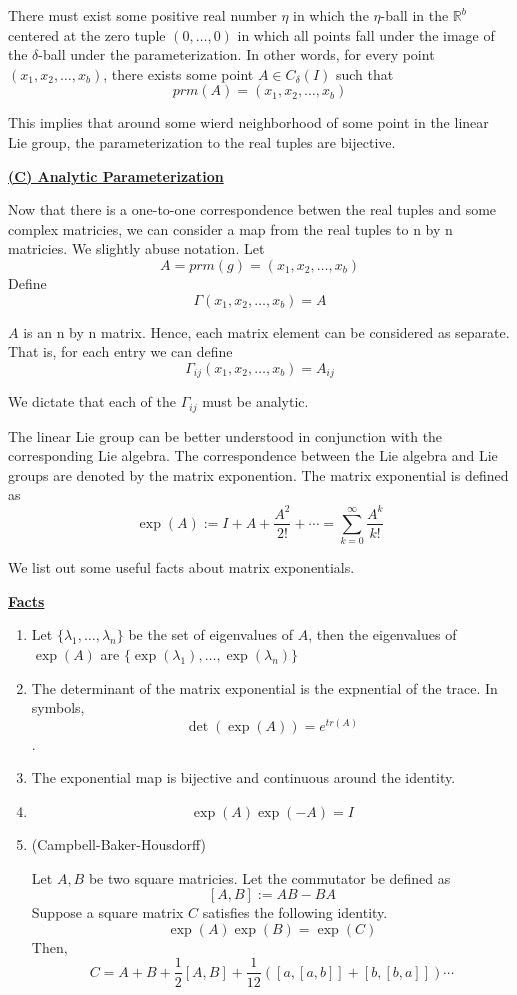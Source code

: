 \documentclass{article}
\newcommand{\new}[1]{
    \vspace{2mm}
    \noindent
    \textbf{
    \underline{#1}}
}
\begin{document}
There must exist some positive real number $\eta$ in which 
the $\eta$-ball in the $\mathbb{R}^b$ centered at the zero tuple 
$(0, \dots, 0)$ in which all points fall under the image of the 
$\delta$-ball under the parameterization. In other words, for every point 
$(x_1, x_2, \dots, x_b)$, there exists some point $A \in C_\delta(I)$ such that 
\[
    prm(A) = (x_1, x_2, \dots, x_b)
\]

This implies that around some wierd neighborhood of some point in the 
linear Lie group, the parameterization to the real tuples are bijective. 

\new{
(C) Analytic Parameterization
}

Now that there is a one-to-one correspondence betwen 
the real tuples and some complex matricies, we can consider 
a map from the real tuples to n by n matricies. 
We slightly abuse notation. Let 
\[
    A = prm(g) = (x_1, x_2, \dots, x_b)
    \]
Define 
\[
    \Gamma (x_1, x_2, \dots, x_b) = A
\]

$A$ is an n by n matrix. Hence, each matrix element can be considered 
as separate. That is, for each entry we can define
\[
    \Gamma _{ij}(x_1, x_2, \dots, x_b) = A_{ij}
\]

We dictate that each of the $\Gamma_{ij}$ must be analytic. 

The linear Lie group can be better understood in conjunction with 
the corresponding Lie algebra. The correspondence between the 
Lie algebra and Lie groups are denoted by the matrix exponention. 
The matrix exponential is defined as 
\[
    \exp(A) := I + A + \frac {A^2} {2!} + \cdots 
    = \sum_{k = 0} ^ {\infty} \frac {A^k} {k!}
\]

We list out some useful facts about matrix exponentials. 

\new{Facts}
\begin{enumerate}
\item Let $\{\lambda_1, \dots, \lambda_n\}$ be the set of 
eigenvalues of $A$, then the eigenvalues of $\exp(A)$ are 
$\{\exp(\lambda_1), \dots, \exp(\lambda_n)\}$

\item The determinant of the matrix exponential is the expnential 
of the trace. In symbols, 
\[
    \det(\exp(A)) = e^{tr(A)}
\]. 

\item
The exponential map is bijective and continuous around the identity. 

\item
\[
    \exp(A) \exp(-A) = I
\]

\item (Campbell-Baker-Housdorff)

Let $A, B$ be two square matricies. Let the commutator be defined as 
\[
    [A, B] := AB - BA
\]
Suppose a square matrix $C$ satisfies the following identity. 
\[
    \exp(A)\exp(B) = \exp(C)
\]
Then, 
\[
    C = A + B + \frac 1 2 [A, B] + \frac 1 {12} ([a, [a, b]] + [b, [b, a]]) \cdots
\]
\end{enumerate}
\end{document}
